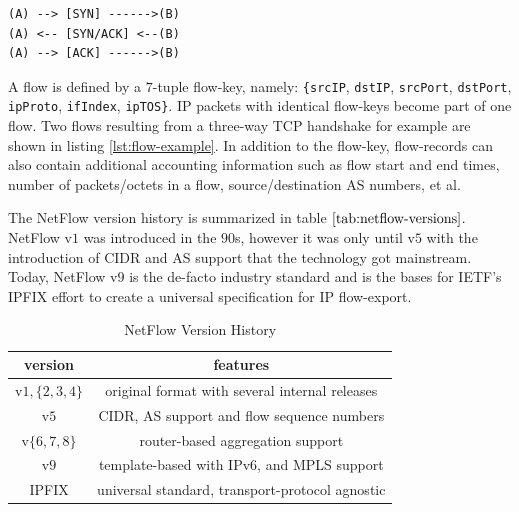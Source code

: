\begin{lstlisting}
(A) --> [SYN] ------>(B)
(A) <-- [SYN/ACK] <--(B)
(A) --> [ACK] ------>(B)
\end{lstlisting}
A flow is defined by a $7$-tuple flow-key, namely: \texttt{\{srcIP}, \texttt{dstIP}, \texttt{srcPort}, \texttt{dstPort}, \texttt{ipProto}, \texttt{ifIndex}, \texttt{ipTOS\}}. \ac{IP} packets with identical flow-keys become part of one flow. Two flows resulting from a three-way \ac{TCP} handshake for  example are shown in listing \ref{lst:flow-example}. In addition to the flow-key, flow-records can also contain additional accounting information such as flow start and end times, number of packets/octets in a flow, source/destination \ac{AS} numbers, et al. 

The NetFlow version history is summarized in table $\ref{tab:netflow-versions}$. NetFlow v$1$ was introduced in the $90$s, however it was only until v$5$ with the introduction of \ac{CIDR} and \ac{AS} support that the  technology got mainstream. Today, NetFlow v$9$ is the de-facto industry standard and is the bases for \ac{IETF}'s \ac{IPFIX} effort to create a universal specification for \ac{IP} flow-export. 
\begin{table}[h!]
	\begin{center}
		\begin{tabular}{|c|c|}
			\hline	
			version & features \\
			\hline
			\hline 
			v$1, \{2,3,4\}$ & original format with several internal releases \\
			\hline 
			v$5$ & \ac{CIDR}, \ac{AS} support and flow sequence numbers \\
			\hline
			v$\{6,7,8\}$ & router-based aggregation support \\
			\hline
			v$9$ & template-based with \ac{IP}v$6$, and \ac{MPLS} support \\
			\hline
			\ac{IPFIX} & universal standard, transport-protocol agnostic\\
			\hline
		\end{tabular}
	\end{center}
	\caption{NetFlow Version History}
\label{tab:netflow-versions}
\end{table}

